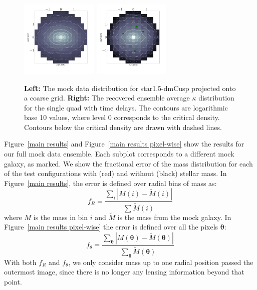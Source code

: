 \documentclass[galley,usenatbib]{mn2e}
\renewcommand{\vec}[1]{\ensuremath{\boldsymbol{#1}}}
\newcommand{\figref}[1] {Figure~\ref{#1}}
\newcommand{\mockBC}{{\sc star1.5-dmCusp}}
\begin{document}
\begin{figure}
\includegraphics[width=0.33\textwidth]{BCQuadR1a_TmS-kappa-a.pdf}
\includegraphics[width=0.33\textwidth]{BCQuadR1a_TmS-kappa-b.pdf}
\caption{ \textbf{Left:} The mock data distribution for \mockBC{} projected
onto a coarse grid.  \textbf{Right:} The recovered ensemble average $\kappa$
distribution for the single quad with time delays. The contours are logarithmic
base 10 values, where level 0 corresponds to the critical density. Contours
below the critical density are drawn with dashed lines.}
\label{2d mass reconstruction}
\end{figure}

\figref{main results} and \figref{main results pixel-wise} show the results for
our full mock data ensemble. Each subplot corresponds to a different mock
galaxy, as marked. We show the fractional error of the mass distribution for
each of the test configurations with (red) and without (black) stellar mass. In
\figref{main results}, the error is defined over radial bins of mass as:
%
\begin{equation} \label{ferror R}
  f_R = \frac {\sum_i \left|M(i) - \tilde M(i)\right| } {\sum \tilde M(i)}
\end{equation}
%
where $M$ is the mass in bin $i$ and $\tilde M$ is the mass from the mock galaxy.
In \figref{main results pixel-wise} the error is defined over all the pixels $\vec\theta$:
%
\begin{equation} \label{ferror theta}
f_\theta = \frac {\sum_{\vec\theta} \left|M(\vec\theta) - \tilde M(\vec\theta)\right| } {\sum_{\vec\theta} \tilde M(\vec\theta)}
\end{equation}
With both $f_R$ and $f_\theta$, we only consider mass up to one radial
position passed the outermost image, since there is no longer any lensing
information beyond that point.
\end{document}
